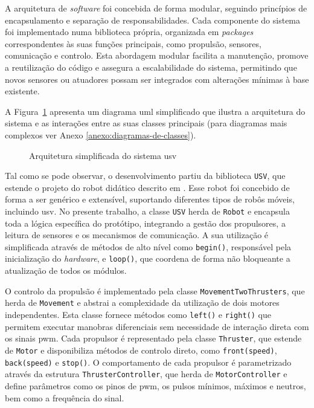 A arquitetura de \emph{software} foi concebida de forma modular, seguindo princípios de encapsulamento e separação de responsabilidades. Cada componente do sistema foi implementado numa biblioteca própria, organizada em \emph{packages} correspondentes às suas funções principais, como propulsão, sensores, comunicação e controlo. Esta abordagem modular facilita a manutenção, promove a reutilização do código e assegura a escalabilidade do sistema, permitindo que novos sensores ou atuadores possam ser integrados com alterações mínimas à base existente.  

A Figura~\ref{fig:uml-simplificado} apresenta um diagrama \gls{uml} simplificado que ilustra a arquitetura do sistema e as interações entre as suas classes principais (para diagramas mais complexos ver Anexo \ref{anexo:diagramas-de-classes}). 

\begin{figure}[H]
  \centering
  \resizebox{\textwidth}{!}{%
  }
  \caption{Arquitetura simplificada do sistema \gls{usv}}
  \label{fig:uml-simplificado}
\end{figure}

Tal como se pode observar, o desenvolvimento partiu da biblioteca \texttt{USV}, que estende o projeto do robot didático descrito em \cite{didactic-robot-thesis}. Esse robot foi concebido de forma a ser genérico e extensível, suportando diferentes tipos de robôs móveis, incluindo \gls{usv}. No presente trabalho, a classe \texttt{USV} herda de \texttt{Robot} e encapsula toda a lógica específica do protótipo, integrando a gestão dos propulsores, a leitura de sensores e os mecanismos de comunicação. A sua utilização é simplificada através de métodos de alto nível como \texttt{begin()}, responsável pela inicialização do \emph{hardware}, e \texttt{loop()}, que coordena de forma não bloqueante a atualização de todos os módulos.  

O controlo da propulsão é implementado pela classe \texttt{MovementTwoThrusters}, que herda de \texttt{Movement} e abstrai a complexidade da utilização de dois motores independentes. Esta classe fornece métodos como \texttt{left()} e \texttt{right()} que permitem executar manobras diferenciais sem necessidade de interação direta com os sinais \gls{pwm}. Cada propulsor é representado pela classe \texttt{Thruster}, que estende de \texttt{Motor} e disponibiliza métodos de controlo direto, como \texttt{front(speed)}, \texttt{back(speed)} e \texttt{stop()}. O comportamento de cada propulsor é parametrizado através da estrutura \texttt{ThrusterController}, que herda de \texttt{MotorController} e define parâmetros como os pinos de \gls{pwm}, os pulsos mínimos, máximos e neutros, bem como a frequência do sinal.  

